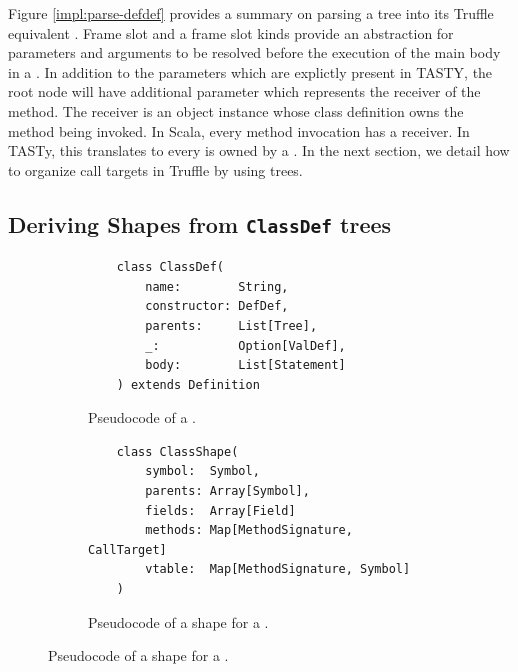 Figure \ref{impl:parse-defdef} provides a summary on parsing a  tree into its Truffle equivalent .
Frame slot and a frame slot kinds provide an abstraction for parameters and arguments to be resolved before the execution of the main body in a .
In addition to the parameters which are explictly present in TASTY, the root node will have additional parameter which represents the receiver of the method.
The receiver is an object instance whose class definition owns the method being invoked.
In Scala, every method invocation has a receiver.
In TASTy, this translates to every  is owned by a .
In the next section, we detail how to organize call targets in Truffle by using  trees.

\subsection{Deriving Shapes from \texttt{ClassDef} trees}

\begin{figure}[!htb]
	\centering
	\begin{subfigure}[b]{0.48\textwidth}
	\begin{verbatim}
	class ClassDef(
		name:        String,
		constructor: DefDef, 
		parents:     List[Tree], 
		_:           Option[ValDef], 
		body:        List[Statement]
	) extends Definition
		\end{verbatim}
	\caption{Pseudocode of a .}
	\label{recall:classdef}
	\end{subfigure}
	\hfill
	\begin{subfigure}[b]{0.48\textwidth}
	\begin{verbatim}
	class ClassShape(
		symbol:  Symbol,
		parents: Array[Symbol],
		fields:  Array[Field]
		methods: Map[MethodSignature, CallTarget]
		vtable:  Map[MethodSignature, Symbol]
	)
	\end{verbatim}
	\caption{Pseudocode of a shape for a .}
	\label{impl:classshape}
	\end{subfigure}
\end{figure}

